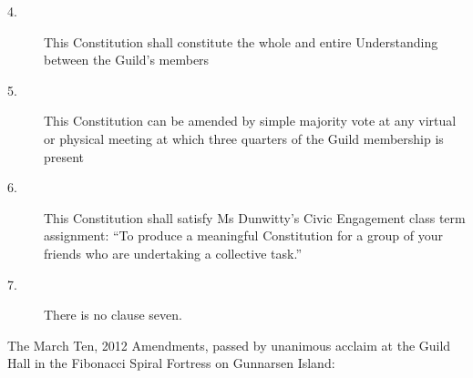 \begin{description}
\item[4.] This Constitution shall constitute the whole and entire 
Understanding between the Guild's members

\item[5.] This Constitution can be amended by simple majority vote at any 
virtual or physical meeting at which three quarters of the Guild 
membership is present

\item[6.] This Constitution shall satisfy Ms Dunwitty's Civic Engagement class 
term assignment: “To produce a meaningful Constitution for a group of 
your friends who are undertaking a collective task.”

\item[7.] There is no clause seven.
\end{description}

\tb

The March Ten, 2012 Amendments, passed by unanimous acclaim at the 
Guild Hall in the Fibonacci Spiral Fortress on Gunnarsen Island:

